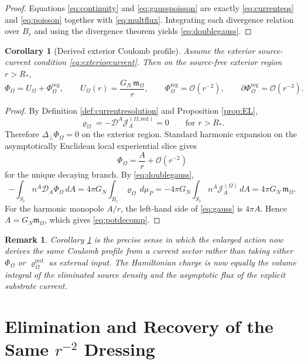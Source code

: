 \documentclass[11pt]{article}
\newcommand{\SpatialD}{\mathcal D}
\newcommand{\LapPerp}{\Delta_\perp}
\newcommand{\FlowPot}{\Phi_\Omega}
\newcommand{\FlowPotReg}{\Phi_\Omega^{\mathrm{reg}}}
\newcommand{\CoulPot}{U_\Omega}
\newcommand{\SourceDensity}{\varrho_\Omega}
\newcommand{\SourceDensityRed}{\varrho_\Omega^{\mathrm{red}}}
\newcommand{\SourceCurrent}{\mathcal J^{(\Omega)}}
\newcommand{\SourceCurrentRed}{\mathcal J^{(\Omega,\mathrm{red})}}
\newcommand{\HamChargeOmega}{\mathfrak m_\Omega}
\newtheorem{remark}{Remark}
\newtheorem{corollary}{Corollary}
\begin{document}
\begin{proof}
Equations \eqref{eq:continuity} and \eqref{eq:gausspoisson} are exactly \eqref{eq:currenteqs} and \eqref{eq:poisson} together with \eqref{eq:multflux}. Integrating each divergence relation over \(B_r\) and using the divergence theorem yields \eqref{eq:doublegauss}.
\end{proof}

\begin{corollary}[Derived exterior Coulomb profile]
\label{cor:coulomb}
Assume the exterior source-current condition \eqref{eq:exteriorcurrent}. Then on the source-free exterior region \(r>R_\ast\),
\begin{equation}
\FlowPot
=
\CoulPot+\FlowPotReg,
\qquad
\CoulPot(r)=\frac{G_N\,\HamChargeOmega}{r},
\qquad
\FlowPotReg=\mathcal O(r^{-2}),
\qquad
\partial\FlowPotReg=\mathcal O(r^{-3}).
\label{eq:potdecomp}
\end{equation}
\end{corollary}

\begin{proof}
By Definition \ref{def:currentresolution} and Proposition \ref{prop:EL},
\[
\SourceDensity
=
-\SpatialD^A\SourceCurrentRed_A
=
0
\qquad
\text{for } r>R_\ast.
\]
Therefore \(\LapPerp\FlowPot=0\) on the exterior region. Standard harmonic expansion on the asymptotically Euclidean local experiential slice gives
\[
\FlowPot=\frac{A}{r}+\mathcal O(r^{-2})
\]
for the unique decaying branch. By \eqref{eq:doublegauss},
\begin{equation}
-\int_{S_r} n^A\SpatialD_A\FlowPot\,dA
=
4\pi G_N\int_{B_r}\SourceDensity\,d\mu_P
=
-4\pi G_N\int_{S_r} n^A\SourceCurrent_A\,dA
=
4\pi G_N\,\HamChargeOmega.
\label{eq:gauss}
\end{equation}
For the harmonic monopole \(A/r\), the left-hand side of \eqref{eq:gauss} is \(4\pi A\). Hence \(A=G_N\HamChargeOmega\), which gives \eqref{eq:potdecomp}.
\end{proof}

\begin{remark}
Corollary \ref{cor:coulomb} is the precise sense in which the enlarged action now derives the same Coulomb profile from a current sector rather than taking either \(\FlowPot\) or \(\SourceDensityRed\) as external input. The Hamiltonian charge is now equally the volume integral of the eliminated source density and the asymptotic flux of the explicit substrate current.
\end{remark}

\section{Elimination and Recovery of the Same \(r^{-2}\) Dressing}
\end{document}

